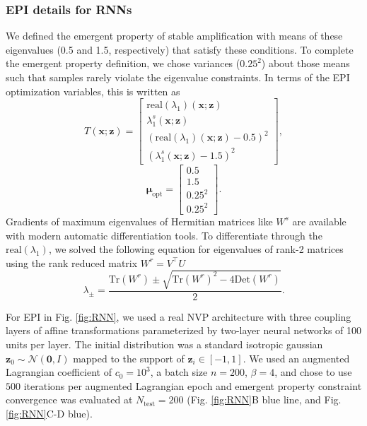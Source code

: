 \documentclass[11pt]{article}
\begin{document}
\subsubsection{EPI details for RNNs}
We defined the emergent property of stable amplification with means of these eigenvalues (0.5 and 1.5, respectively) that satisfy these conditions.
To complete the emergent property definition, we chose variances ($0.25^2$) about those means such that samples rarely violate the eigenvalue constraints.
In terms of the EPI optimization variables, this is written as
\begin{equation} 
T(\mathbf{x}; \mathbf{z}) = \begin{bmatrix} \text{real}(\lambda_1)(\mathbf{x}; \mathbf{z}) \\ \lambda_1^s(\mathbf{x}; \mathbf{z}) \\ \left(\text{real}(\lambda_1)(\mathbf{x}; \mathbf{z}) - 0.5 \right)^2 \\ \left( \lambda_1^s(\mathbf{x}; \mathbf{z})  - 1.5 \right)^2 \end{bmatrix},
\end{equation}
\begin{equation} 
\bm{\mu}_{\text{opt}} = \begin{bmatrix} 0.5 \\ 1.5 \\ 0.25^2 \\ 0.25^2 \end{bmatrix}.
\end{equation}
Gradients of maximum eigenvalues of Hermitian matrices like $W^s$ are available with modern automatic differentiation tools.
To differentiate through the $\text{real}(\lambda_1)$, we solved the following equation for eigenvalues of rank-2 matrices using the rank reduced matrix $W^r = V^{\top} U$
\begin{equation}
\lambda_{\pm} = \frac{\text{Tr}(W^r) \pm \sqrt{\text{Tr}(W^r)^2 - 4\text{Det}(W^r)}}{2}.
\end{equation}

For EPI in Fig. \ref{fig:RNN}, we used a real NVP architecture with three coupling layers of affine transformations parameterized by two-layer neural networks of 100 units per layer.
The initial distribution was a standard isotropic gaussian $\mathbf{z}_0 \sim \mathcal{N}(\mathbf{0}, I)$ mapped to the support of $\mathbf{z}_i \in [-1, 1]$. 
We used an augmented Lagrangian coefficient of $c_0 = 10^{3}$, a batch size $n=200$, $\beta=4$, and chose to use $500$ iterations per augmented Lagrangian epoch and emergent property constraint convergence was evaluated at $N_{\text{test}} = 200$ (Fig. \ref{fig:RNN}B blue line, and Fig. \ref{fig:RNN}C-D blue).
\end{document}
